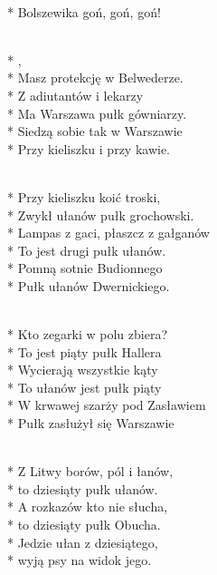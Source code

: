 \begin{lyrics}[longestline={\intertitle{1. Pułk Szwoleżerów J. Piłsudskiego}}]

\begin{chorus}
\\*
Bolszewika goń, goń, goń!
\end{chorus}

\\*
\smallskip
{},\\*
Masz protekcję w Belwederze.\\*
\medskip
Z adiutantów i lekarzy\\*
Ma Warszawa pułk gówniarzy.\\*
\medskip
Siedzą sobie tak w Warszawie\\*
Przy kieliszku i przy kawie.

\\*
\smallskip
Przy kieliszku koić troski,\\*
Zwykł ułanów pułk grochowski.\\*
\medskip
Lampas z gaci, płaszcz z gałganów\\*
To jest drugi pułk ułanów.\\*
\medskip
Pomną sotnie Budionnego\\*
Pułk ułanów Dwernickiego.

\\*
\smallskip
Kto zegarki w polu zbiera?\\*
To jest piąty pułk Hallera\\*
\medskip
Wycierają wszystkie kąty\\*
To ułanów jest pułk piąty\\*
\medskip
W krwawej szarży pod Zasławiem\\*
Pułk zasłużył się Warszawie

\\*
\smallskip
Z Litwy borów, pól i łanów,\\*
to dziesiąty pułk ułanów.\\*
\medskip
A rozkazów kto nie słucha,\\*
to dziesiąty pułk Obucha.\\*
\medskip
Jedzie ułan z dziesiątego,\\*
wyją psy na widok jego.

\breaklyrics


\end{lyrics}
